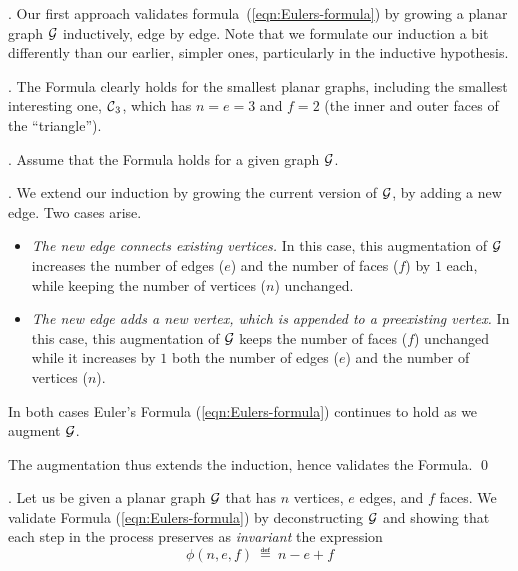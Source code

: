 \medskip


. 
Our first approach validates formula~(\ref{eqn:Eulers-formula}) by growing a planar graph $\mbox{$\cal G$}$
inductively, edge by edge.  Note that we formulate our induction a bit differently than our earlier, simpler ones, particularly in the inductive hypothesis.

\smallskip

.
The Formula clearly holds for the smallest planar graphs, including the smallest interesting one, $\mbox{$\cal C$}_3$, which has $n = e = 3$ and $f =2$ (the inner and outer faces of the ``triangle'').

\smallskip

.
Assume that the Formula holds for a given graph $\mbox{$\cal G$}$.

\smallskip

.
We extend our induction by growing the current version of $\mbox{$\cal G$}$, by adding a new edge.  Two cases arise.
\begin{itemize}
\item
{\it The new edge connects existing vertices.}
In this case, this augmentation of $\mbox{$\cal G$}$ increases the number of edges ($e$) and the number of faces ($f$) by $1$ each, while keeping the number of vertices ($n$) unchanged.

\medskip\item
{\it The new edge adds a new vertex, which is appended to a preexisting vertex.}
In this case, this augmentation of $\mbox{$\cal G$}$ keeps the number of faces ($f$) unchanged while
it increases by $1$ both the number of edges ($e$) and the number of vertices ($n$). 
\end{itemize}
In both cases Euler's Formula (\ref{eqn:Eulers-formula}) continues to hold as we augment $\mbox{$\cal G$}$.  

The augmentation thus extends the induction, hence validates the Formula.  \qed

\bigskip


.
Let us be given a planar graph $\mbox{$\cal G$}$ that has $n$ vertices, $e$ edges, and $f$ faces.  We validate Formula (\ref{eqn:Eulers-formula}) by deconstructing $\mbox{$\cal G$}$ and showing that each step in the process preserves as {\it invariant} the expression
\begin{equation}
\label{eq:phi-in-euler-formula}
 \phi(n,e,f) \ \eqdef \ n-e+f
\end{equation}


